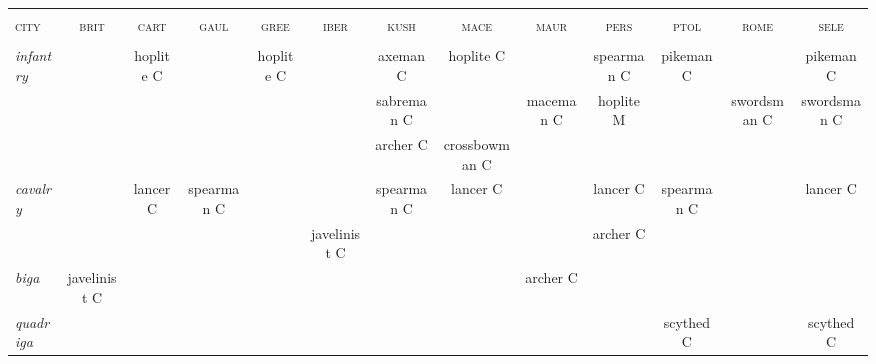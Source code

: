 \documentclass{article}
\newcommand{\brit}{\textsc{\color{blue} brit}}
\newcommand{\cart}{\textsc{\color{blue} cart}}
\newcommand{\gaul}{\textsc{\color{blue} gaul}}
\newcommand{\gree}{\textsc{\color{blue} gree}}
\newcommand{\iber}{\textsc{\color{blue} iber}}
\newcommand{\kush}{\textsc{\color{blue} kush}}
\newcommand{\mace}{\textsc{\color{blue} mace}}
\newcommand{\maur}{\textsc{\color{blue} maur}}
\newcommand{\pers}{\textsc{\color{blue} pers}}
\newcommand{\ptol}{\textsc{\color{blue} ptol}}
\newcommand{\rome}{\textsc{\color{blue} rome}}
\newcommand{\sele}{\textsc{\color{blue} sele}}
\newcommand{\city}{\textsc{\color{blue} city}}
\begin{document}
\begin{landscape}
\begin{tabular}{l||c|c|c|c||c|c|c|c||c|c|c|c}
\hline
\hline
 &                &                &                &                &                &                &                &                &                &                &                &                \\
\city %
 & \brit          & \cart          & \gaul          & \gree          & \iber          & \kush          & \mace          & \maur          & \pers          & \ptol          & \rome          & \sele          \\
 &                &                &                &                &                &                &                &                &                &                &                &                \\
\hline
\hline\textit{infantry}
 &                & hoplite C      &                & hoplite C      &                & axeman C       & hoplite C      &                & spearman C     & pikeman C      &                & pikeman C      \\
 &                &                &                &                &                & sabreman C     &                & maceman C      & hoplite M      &                & swordsman C    & swordsman C    \\
 &                &                &                &                &                & archer C       & crossbowman C  &                &                &                &                &                \\
\hline\textit{cavalry}
 &                & lancer C       & spearman C     &                &                & spearman C     & lancer C       &                & lancer C       & spearman C     &                & lancer C       \\
 &                &                &                &                & javelinist C   &                &                &                & archer C       &                &                &                \\
\hline\textit{biga}
 & javelinist C   &                &                &                &                &                &                & archer C       &                &                &                &                \\
\hline\textit{quadriga}
 &                &                &                &                &                &                &                &                &                & scythed C      &                & scythed C      \\

\end{tabular}
\end{landscape}
\end{document}
